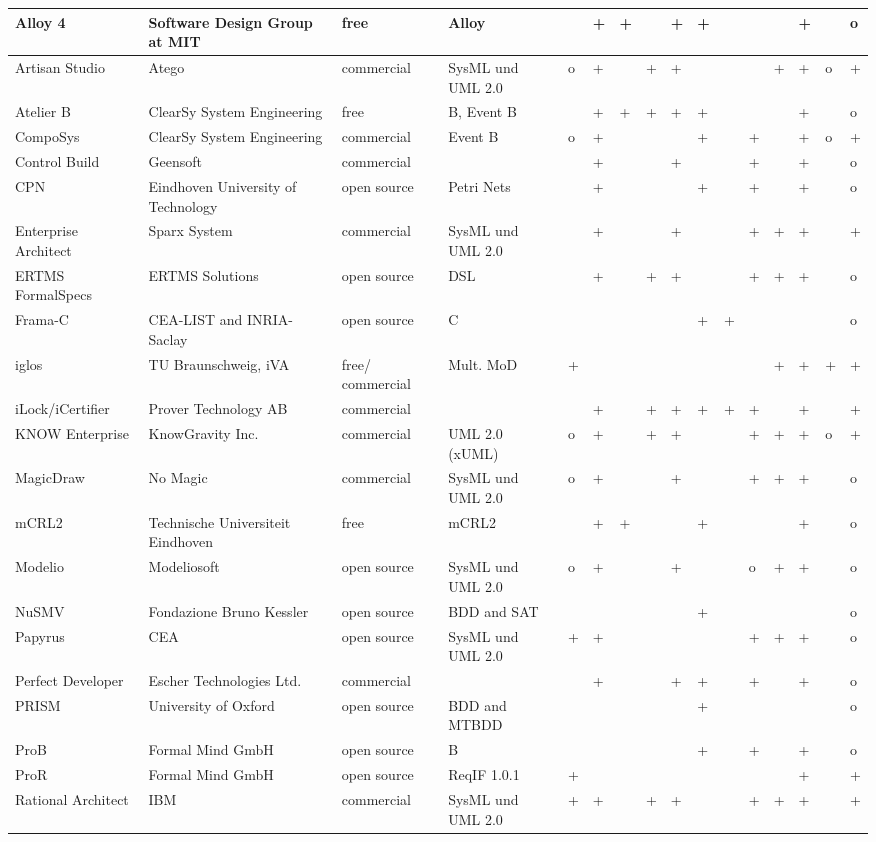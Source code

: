 \documentclass{./template/openetcs_report}
\begin{document}
\begin{landscape}
\begin{center}
\begin{longtable}{|m{2.5cm}|p{3cm}|m{1.8cm}|p{3.5cm}||m{1.2cm}|m{0.2cm}|m{0.2cm}|m{0.2cm}|m{0.7cm}|m{0.2cm}|m{0.7cm}|m{0.2cm}|m{0.6cm}|m{1.2cm}|m{0.2cm}|m{0.2cm}|}
Alloy 4&Software Design Group at MIT&free &Alloy&&+&+&&+&+&&&&+&&o \\ \hline
Artisan Studio&Atego&commercial&SysML und UML 2.0&o&+&&+&+&&&&+&+&o&+ \\ \hline
Atelier B&ClearSy System Engineering&free &B, Event B&&+&+&+&+&+&&&&+&&o \\ \hline
CompoSys&ClearSy System Engineering&commercial&Event B&o&+&&&&+&&+&&+&o&+ \\ \hline
Control Build&Geensoft&commercial&&&+&&&+&&&+&&+&&o \\ \hline
CPN&Eindhoven University of Technology&open source&Petri Nets&&+&&&&+&&+&&+&&o \\ \hline
Enterprise Architect&Sparx System&commercial&SysML und UML 2.0&&+&&&+&&&+&+&+&&+ \\ \hline
ERTMS FormalSpecs&ERTMS Solutions&open source&DSL&&+&&+&+&&&+&+&+&&o \\ \hline
Frama-C&CEA-LIST and INRIA-Saclay&open source&C&&&&&&+&+&&&&&o \\ \hline
iglos&TU Braunschweig, iVA&free/ commercial&Mult. MoD&+&&&&&&&&+&+&+&+ \\ \hline
iLock/iCertifier&Prover Technology AB &commercial&&&+&&+&+&+&+&+&&+&&+ \\ \hline
KNOW Enterprise&KnowGravity Inc.&commercial&UML 2.0 (xUML)&o&+&&+&+&&&+&+&+&o&+ \\ \hline
MagicDraw&No Magic&commercial&SysML und UML 2.0&o&+&& &+&&&+&+&+&&o \\ \hline
mCRL2&Technische Universiteit Eindhoven&free&mCRL2&&+&+&&&+&&&&+&&o \\ \hline
Modelio&Modeliosoft&open source&SysML und UML 2.0&o&+&&&+&&&o&+&+&&o \\ \hline
NuSMV&Fondazione Bruno Kessler&open source&BDD and SAT&&&&&&+&&&&&&o \\ \hline
Papyrus&CEA&open source&SysML und UML 2.0&+&+&&&&&&+&+&+&&o \\ \hline
Perfect Developer&Escher Technologies Ltd.&commercial&&&+&&&+&+&&+&&+&&o \\ \hline
PRISM&University of Oxford&open source&BDD and MTBDD&&&&&&+&&&&&&o \\ \hline
ProB&Formal Mind GmbH&open source&B&&&&&&+&&+&&+&&o \\ \hline
ProR&Formal Mind GmbH&open source&ReqIF 1.0.1&+&&&&&&&&&+&&+ \\ \hline
Rational Architect&IBM&commercial&SysML und UML 2.0&+&+&&+&+&&&+&+&+&&+ \\ \hline

\end{longtable}
\end{center}
\end{landscape}
\end{document}
